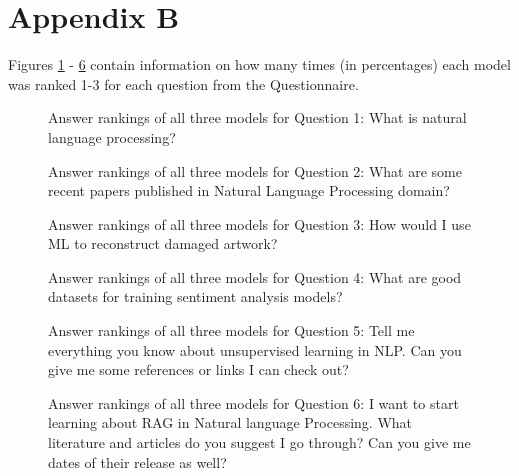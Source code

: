 \documentclass[fleqn,moreauthors,10pt]{ds_report}
\begin{document}
\clearpage

\section*{Appendix B}

Figures \ref{fig:question_1} - \ref{fig:question_6} contain information on how many times (in percentages) each model was ranked 1-3 for each question from the Questionnaire.

\begin{figure}[H]
    \centering
    
    \caption{Answer rankings of all three models for Question 1: What is natural language processing?}
    \label{fig:question_1}
\end{figure}

\begin{figure}[H]
    \centering
    
    \caption{Answer rankings of all three models for Question 2: What are some recent papers published in Natural Language Processing domain?}
    \label{fig:question_2}
\end{figure}

\begin{figure}[H]
    \centering
    
    \caption{Answer rankings of all three models for Question 3: How would I use  ML to reconstruct damaged artwork?}
    \label{fig:question_3}
\end{figure}

\begin{figure}[H]
    \centering
    
    \caption{Answer rankings of all three models for Question 4: What are good datasets for training sentiment analysis models?}
    \label{fig:question_4}
\end{figure}

\begin{figure}[H]
    \centering
    
    \caption{Answer rankings of all three models for Question 5: Tell me everything you know about unsupervised learning in NLP. Can you give me some references or links I can check out?}
    \label{fig:question_5}
\end{figure}

\begin{figure}[H]
    \centering
    
    \caption{Answer rankings of all three models for Question 6: I want to start learning about RAG in Natural language Processing. What literature and articles do you suggest I go through? Can you give me dates of their release as well?}
    \label{fig:question_6}
\end{figure}
\end{document}
